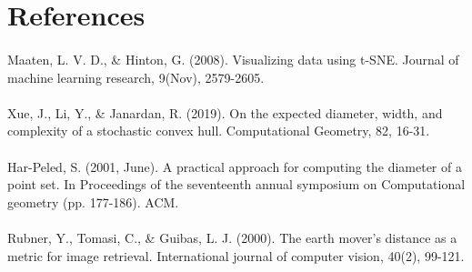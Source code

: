 \documentclass{bigdata}
\begin{document}
\section{References}
\paragraph{} Maaten, L. V. D., \& Hinton, G. (2008). Visualizing data using t-SNE. Journal of machine learning research, 9(Nov), 2579-2605.
\paragraph{} Xue, J., Li, Y., \& Janardan, R. (2019). On the expected diameter, width, and complexity of a stochastic convex hull. Computational Geometry, 82, 16-31.
\paragraph{} Har-Peled, S. (2001, June). A practical approach for computing the diameter of a point set. In Proceedings of the seventeenth annual symposium on Computational geometry (pp. 177-186). ACM.
\paragraph{} Rubner, Y., Tomasi, C., \& Guibas, L. J. (2000). The earth mover's distance as a metric for image retrieval. International journal of computer vision, 40(2), 99-121.
\end{document}
